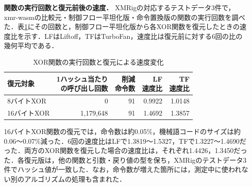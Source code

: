 \documentclass[submit,techrep]{ipsj}
\begin{document}
\noindent\textbf{関数の実行回数と復元前後の速度．}
XMRigの対応するテストデータ3件で，xmr-wasmの比較元・制御フロー平坦化版・命令置換版の関数の実行回数を調べた．表\ref{tab:xor-restoration}にその回数と，制御フロー平坦化版から各XOR関数を復元したときの速度比を示す．LFはLiftoff，TFはTurboFan，速度比は復元前に対する6回の比の幾何平均である．
\begin{table}[t]
\centering\small
\caption{XOR関数の実行回数と復元による速度変化}
\label{tab:xor-restoration}
\setlength{\tabcolsep}{2pt}
\begin{tabular}{lrrrr}
\hline
復元対象 & \shortstack{1ハッシュ当たり\\の呼び出し回数} & \shortstack{削減\\命令数} & \shortstack{LF\\速度比} & \shortstack{TF\\速度比} \\
\hline
8バイトXOR & 0 & 91 & 0.9922 & 1.0148 \\
16バイトXOR & 1,179,648 & 91 & 1.4692 & 1.3857 \\
\hline
\end{tabular}
\end{table}

16バイトXOR関数の復元では，命令数は約0.05\%，機械語コードのサイズは約0.06～0.07\%減った．6回の速度比はLFで1.3819～1.5327，TFで1.3227～1.4690だった．両方のXOR関数を復元した場合の速度比は，それぞれ1.4426，1.3450だった．各復元版は，他の関数と引数・戻り値の型を保ち，XMRigのテストデータ3件でハッシュ値が一致した．なお，命令数が増えた箇所には，測定中に使われない別のアルゴリズムの処理も含まれた．
\end{document}
